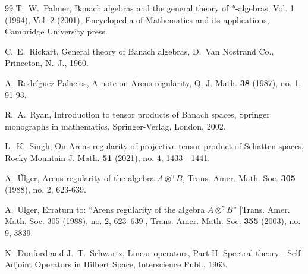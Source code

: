 \documentclass[a4]{amsart}
\theoremstyle{cupthm}
\theoremstyle{cupdefn}
\theoremstyle{cuprem}
\numberwithin{equation}{section}
\newcommand{\obp}{\otimes^{\gamma}}
\begin{document}
\begin{thebibliography}{99}
 T.~W.~Palmer, Banach algebras and the general theory
  of $*$-algebras, Vol. 1 (1994), Vol. 2 (2001), Encyclopedia of
  Mathematics and its applications, Cambridge University press.

       C.~E.~Rickart, General theory of Banach
        algebras, D.~Van Nostrand Co., Princeton, N.~J., 1960.
        
  A.~Rodr\'iguez-Palacios, A note on Arens regularity,
   Q. J. Math.  {\bf 38} (1987), no. 1, 91-93.

       R.~A.~Ryan, Introduction to tensor products of Banach
  spaces, Springer monographs in mathematics, Springer-Verlag, London, 2002.

 L.~K.~Singh, On Arens regularity of projective tensor
  product of Schatten spaces, Rocky Mountain J. Math. {\bf 51} (2021),
  no. 4, 1433 - 1441.

 A.~\"Ulger, Arens regularity of the algebra $A \obp B$,
	Trans. Amer. Math. Soc. {\bf 305} (1988),  no. 2, 623-639.

   A.~\"Ulger, Erratum to: ``Arens regularity of the
    algebra $A \obp B$'' [Trans. Amer. Math. Soc. 305 (1988), no. 2,
      623–639], Trans. Amer. Math. Soc. {\bf 355} (2003), no. 9, 3839.

   N.~Dunford and J.~T.~Schwartz, Linear
    operators, Part II:  Spectral theory - Self Adjoint Operators in Hilbert
    Space, Interscience Publ., 1963.
\end{thebibliography}
\end{document}
